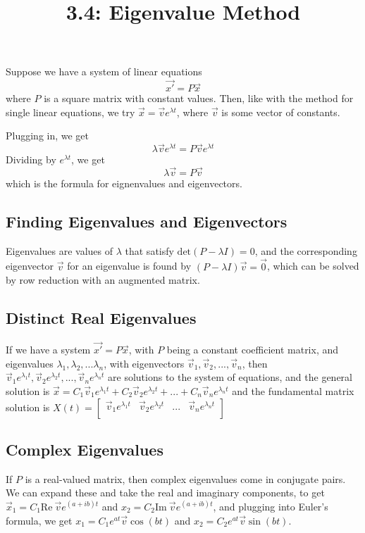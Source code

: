 \documentclass{article}
\title{3.4: Eigenvalue Method}
\begin{document}
\maketitle
Suppose we have a system of linear equations $$\vec{x'} = P\vec{x}$$where $P$ is a square matrix with constant values. Then, like with the method for single linear equations, we try $\vec{x} = \vec{v}e^{\lambda t}$, where $\vec{v}$ is some vector of constants.

Plugging in, we get $$\lambda \vec{v}e^{\lambda t} = P\vec{v}e^{\lambda t}$$Dividing by $e^{\lambda t}$, we get $$\lambda\vec{v} = P \vec{v}$$which is the formula for eignenvalues and eigenvectors.

\subsection{Finding Eigenvalues and Eigenvectors}
Eigenvalues are values of $\lambda$ that satisfy $\text{det}(P - \lambda I) = 0$, and the corresponding eigenvector $\vec{v}$ for an eigenvalue is found by $(P - \lambda I)\vec{v} = \vec{0}$, which can be solved by row reduction with an augmented matrix.
\subsection{Distinct Real Eigenvalues}
If we have a system $\vec{x'} = P\vec{x}$, with $P$ being a constant coefficient matrix, and eigenvalues $\lambda_1,\lambda_2,...\lambda_n$, with eigenvectors $\vec{v}_1, \vec{v}_2,...,\vec{v}_n$, then $\vec{v}_1e^{\lambda_1 t}, \vec{v}_2e^{\lambda_2t}, ... ,\vec{v}_n e^{\lambda_n t}$ are solutions to the system of equations, and the general solution is $\vec{x} = C_1\vec{v}_1 e^{\lambda_1 t} + C_2 \vec{v}_2 e^{\lambda_2t} + ... + C_n\vec{v}_ne^{\lambda_n t}$ and the fundamental matrix solution is $X(t) = \begin{bmatrix}
    \vec{v}_1e^{\lambda_1t} & \vec{v}_2e^{\lambda_2t} & ... & \vec{v}_n e^{\lambda_nt}\\
\end{bmatrix}$

\subsection{Complex Eigenvalues}

If $P$ is a real-valued matrix, then complex eigenvalues come in conjugate pairs. We can expand these and take the real and imaginary components, to get $\vec{x}_1 = C_1\text{Re}\ \vec{v}e^{(a+ib)t} $ and $ x_2 = C_2\text{Im}\ \vec{v}e^{(a+ib)t}$, and plugging into Euler's formula, we get $x_1 = C_1e^{at}\vec{v}\cos(bt)$ and $x_2 = C_2 e^{at}\vec{v}\sin(bt)$.   
\end{document}
